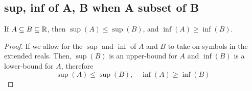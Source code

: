 \documentclass[../../main.tex]{subfiles}
\begin{document}
\subsection{sup, inf of A, B when A subset of B}
\begin{wts}\label{lemma:sup inf with subsets}
    If $A\subseteq B\subseteq \mathbb{R}$, then $\sup(A)\leq \sup(B)$, and $\inf(A)\geq \inf(B)$.
\end{wts}
\begin{proof}
    If we allow for the $\sup$ and $\inf$ of $A$ and $B$ to take on symbols in the extended reals. Then, $\sup(B)$ is an upper-bound for $A$ and $\inf(B)$ is a lower-bound for $A$, therefore
    \[
    \sup(A)\leq \sup(B),\quad \inf(A)\geq \inf(B)
    \]
\end{proof}
\end{document}
